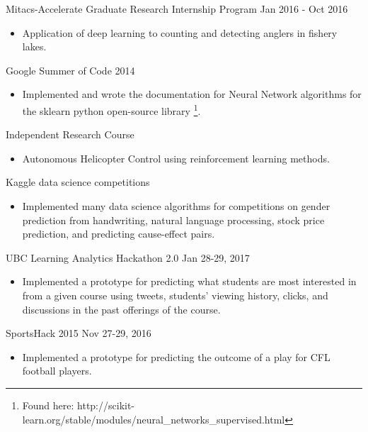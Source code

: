 \documentclass[10pt]{article}
\newenvironment{innerlist}[1][\enskip\textbullet]%
        {\begin{itemize}[#1,leftmargin=*,parsep=0pt,itemsep=0pt,topsep=0pt,partopsep=0pt]}
        {\end{itemize}}
\begin{document}
Mitacs-Accelerate Graduate Research Internship Program \hfill Jan 2016 - Oct 2016
\begin{innerlist}
    \item Application of deep learning to counting and detecting anglers in fishery lakes.\\
\end{innerlist}

Google Summer of Code 2014    
\begin{innerlist}
    \item Implemented and wrote the documentation for Neural Network algorithms for the sklearn python open-source library \footnote{Found here: http://scikit-learn.org/stable/modules/neural\_networks\_supervised.html}.\\
\end{innerlist}

 Independent Research Course
\begin{innerlist}
    \item Autonomous Helicopter Control using reinforcement learning methods.\\
\end{innerlist}

Kaggle data science competitions
\begin{innerlist}
    \item Implemented many data science algorithms for competitions on gender prediction from handwriting, natural language processing,  stock price prediction, and predicting cause-effect pairs.\\
\end{innerlist}



UBC Learning Analytics Hackathon 2.0 \hfill Jan 28-29, 2017
\begin{innerlist}
    \item Implemented a prototype for predicting what students are most interested in from a given course using tweets, students' viewing history, clicks, and discussions in the past offerings of the course.  \\
\end{innerlist}

SportsHack 2015 \hfill Nov 27-29, 2016
\begin{innerlist}
    \item Implemented a prototype for predicting the outcome of a play for CFL football players.
\end{innerlist}
\end{document}
